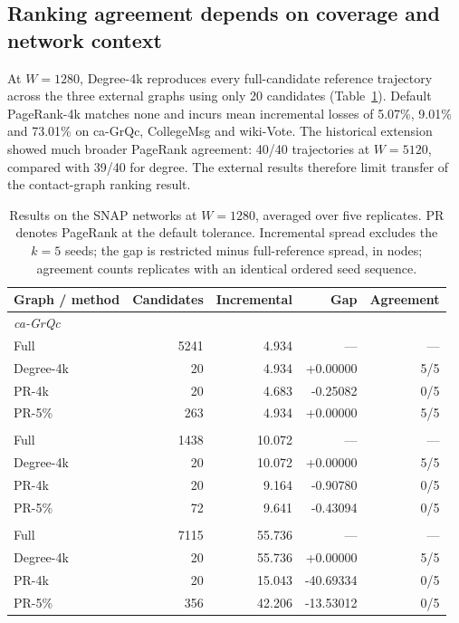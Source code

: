 \documentclass[smallextended]{svjour3}
\newcommand{\CollegePRLoss}{9.01}
\newcommand{\GrqcPRLoss}{5.07}
\newcommand{\WikiPRLoss}{73.01}
\begin{document}
\subsection{Ranking agreement depends on coverage and network context}
At $W=1280$, Degree-4k reproduces every full-candidate reference trajectory across the three external graphs using only 20 candidates (Table~\ref{tab:primary}). Default PageRank-4k matches none and incurs mean incremental losses of \GrqcPRLoss{}\%, \CollegePRLoss{}\% and \WikiPRLoss{}\% on ca-GrQc, CollegeMsg and wiki-Vote. The historical extension showed much broader PageRank agreement: 40/40 trajectories at $W=5120$, compared with 39/40 for degree. The external results therefore limit transfer of the contact-graph ranking result.
\begin{table}[htbp]
\caption{Results on the SNAP networks at $W=1280$, averaged over five replicates. PR denotes PageRank at the default tolerance. Incremental spread excludes the $k=5$ seeds; the gap is restricted minus full-reference spread, in nodes; agreement counts replicates with an identical ordered seed sequence.}\label{tab:primary}
\centering\begin{tabular}{lrrrr}\toprule
Graph / method & Candidates & Incremental & Gap & Agreement \\ \midrule
\multicolumn{5}{l}{\textit{ca-GrQc}} \\
Full & 5241 & 4.934 & --- & --- \\
Degree-4k & 20 & 4.934 & +0.00000 & 5/5 \\
PR-4k & 20 & 4.683 & -0.25082 & 0/5 \\
PR-5\% & 263 & 4.934 & +0.00000 & 5/5 \\
\addlinespace
\multicolumn{5}{l}{\textit{CollegeMsg}} \\
Full & 1438 & 10.072 & --- & --- \\
Degree-4k & 20 & 10.072 & +0.00000 & 5/5 \\
PR-4k & 20 & 9.164 & -0.90780 & 0/5 \\
PR-5\% & 72 & 9.641 & -0.43094 & 0/5 \\
\addlinespace
\multicolumn{5}{l}{\textit{wiki-Vote}} \\
Full & 7115 & 55.736 & --- & --- \\
Degree-4k & 20 & 55.736 & +0.00000 & 5/5 \\
PR-4k & 20 & 15.043 & -40.69334 & 0/5 \\
PR-5\% & 356 & 42.206 & -13.53012 & 0/5 \\
\bottomrule\end{tabular}
\end{table}
\end{document}
